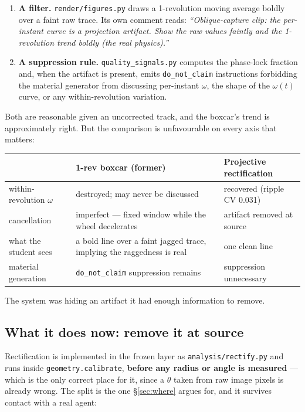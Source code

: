 \documentclass[11pt,a4paper]{article}
\begin{document}
\begin{enumerate}
  \item \textbf{A filter.} \texttt{render/figures.py} draws a 1-revolution moving average boldly
  over a faint raw trace. Its own comment reads: \emph{``Oblique-capture clip: the per-instant
  curve is a projection artifact. Show the raw values faintly and the 1-revolution trend boldly
  (the real physics).''}
  \item \textbf{A suppression rule.} \texttt{quality\_signals.py} computes the phase-lock
  fraction and, when the artifact is present, emits \texttt{do\_not\_claim} instructions
  forbidding the material generator from discussing per-instant $\omega$, the shape of the
  $\omega(t)$ curve, or any within-revolution variation.
\end{enumerate}

Both are reasonable given an uncorrected track, and the boxcar's trend is approximately right.
But the comparison is unfavourable on every axis that matters:

\begin{center}
\begin{tabular}{p{4.2cm}p{5.1cm}p{5.1cm}}
\toprule
 & 1-rev boxcar (former) & Projective rectification \\
\midrule
within-revolution $\omega$ & destroyed; may never be discussed & recovered (ripple CV 0.031) \\
cancellation & imperfect --- fixed window while the wheel decelerates & artifact removed at source \\
what the student sees & a bold line over a faint jagged trace, implying the raggedness is real & one clean line \\
material generation & \texttt{do\_not\_claim} suppression remains & suppression unnecessary \\
\bottomrule
\end{tabular}
\end{center}

The system was hiding an artifact it had enough information to remove.

\subsection{What it does now: remove it at source}
\label{sec:shipped}

Rectification is implemented in the frozen layer as \texttt{analysis/rectify.py} and runs inside
\texttt{geometry.calibrate}, \textbf{before any radius or angle is measured} --- which is the only
correct place for it, since a $\theta$ taken from raw image pixels is already wrong. The split is
the one \S\ref{sec:where} argues for, and it survives contact with a real agent:
\end{document}
